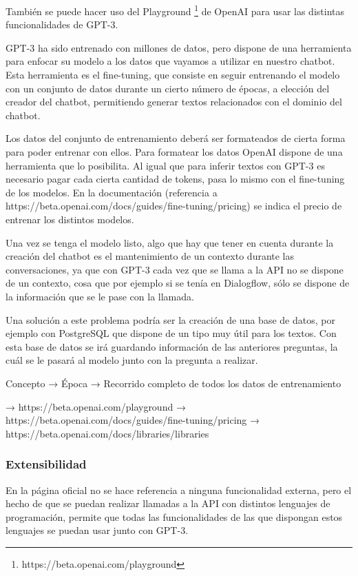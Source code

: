 También se puede hacer uso del Playground \footnote{https://beta.openai.com/playground} de OpenAI para usar las distintas funcionalidades de GPT-3.

GPT-3 ha sido entrenado con millones de datos, pero dispone de una herramienta para enfocar su modelo a los datos que vayamos a utilizar en nuestro chatbot. Esta herramienta es el fine-tuning, que consiste en seguir entrenando el modelo con un conjunto de datos durante un cierto número de épocas, a elección del creador del chatbot, permitiendo generar textos relacionados con el dominio del chatbot.

Los datos del conjunto de entrenamiento deberá ser formateados de cierta forma para poder entrenar con ellos. Para formatear los datos OpenAI dispone de una herramienta que lo posibilita. Al igual que para inferir textos con GPT-3 es necesario pagar cada cierta cantidad de tokens, pasa lo mismo con el fine-tuning de los modelos. En la documentación (referencia a https://beta.openai.com/docs/guides/fine-tuning/pricing) se indica el precio de entrenar los distintos modelos.

Una vez se tenga el modelo listo, algo que hay que tener en cuenta durante la creación del chatbot es el mantenimiento de un contexto durante las conversaciones, ya que con GPT-3 cada vez que se llama a la API no se dispone de un contexto, cosa que por ejemplo si se tenía en Dialogflow, sólo se dispone de la información que se le pase con la llamada.

Una solución a este problema podría ser la creación de una base de datos, por ejemplo con PostgreSQL que dispone de un tipo muy útil para los textos. Con esta base de datos se irá guardando información de las anteriores preguntas, la cuál se le pasará al modelo junto con la pregunta a realizar.





Concepto → Época → Recorrido completo de todos los datos de entrenamiento

→ https://beta.openai.com/playground
→ https://beta.openai.com/docs/guides/fine-tuning/pricing
→ https://beta.openai.com/docs/libraries/libraries

\subsubsection*{Extensibilidad}

En la página oficial no se hace referencia a ninguna funcionalidad externa, pero el hecho de que se puedan realizar llamadas a la API con distintos lenguajes de programación, permite que todas las funcionalidades de las que dispongan estos lenguajes se puedan usar junto con GPT-3.

